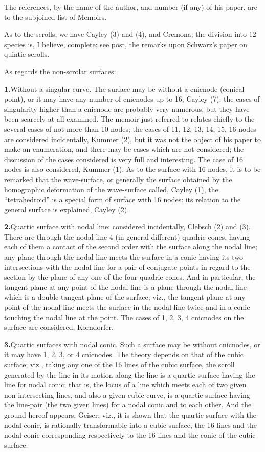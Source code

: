 \documentclass[11pt,a4paper]{article}
\begin{document}
The references, by the name of the author, and number (if any) of his paper, are to the subjoined list of Memoirs.

As to the scrolls, we have Cayley (3) and (4), and Cremona; the division into 12 species is, I believe, complete: see post, the remarks upon Schwarz's paper on quintic scrolls.

As regards the non-scrolar surfaces:

\textbf{1.}\quad Without a singular curve. The surface may be without a cnicnode (conical point), or it may have any number of cnicnodes up to 16, Cayley (7): the cases of singularity higher than a cnicnode are probably very numerous, but they have been scarcely at all examined. The memoir just referred to relates chiefly to the several cases of not more than 10 nodes; the cases of 11, 12, 13, 14, 15, 16 nodes are considered incidentally, Kummer (2), but it was not the object of his paper to make an enumeration, and there may be cases which are not considered; the discussion of the cases considered is very full and interesting. The case of 16 nodes is also considered, Kummer (1). As to the surface with 16 nodes, it is to be remarked that the wave-surface, or generally the surface obtained by the homographic deformation of the wave-surface called, Cayley (1), the ``tetrahedroid'' is a special form of surface with 16 nodes: its relation to the general surface is explained, Cayley (2).

\textbf{2.}\quad Quartic surface with nodal line: considered incidentally, Clebsch (2) and (3). There are through the nodal line 4 (in general different) quadric cones, having each of them a contact of the second order with the surface along the nodal line; any plane through the nodal line meets the surface in a conic having its two intersections with the nodal line for a pair of conjugate points in regard to the section by the plane of any one of the four quadric cones. And in particular, the tangent plane at any point of the nodal line is a plane through the nodal line which is a double tangent plane of the surface; viz., the tangent plane at any point of the nodal line meets the surface in the nodal line twice and in a conic touching the nodal line at the point. The cases of 1, 2, 3, 4 cnicnodes on the surface are considered, Korndorfer.

\textbf{3.}\quad Quartic surfaces with nodal conic. Such a surface may be without cnicnodes, or it may have 1, 2, 3, or 4 cnicnodes. The theory depends on that of the cubic surface; viz., taking any one of the 16 lines of the cubic surface, the scroll generated by the line in its motion along the line is a quartic surface having the line for nodal conic; that is, the locus of a line which meets each of two given non-intersecting lines, and also a given cubic curve, is a quartic surface having the line-pair (the two given lines) for a nodal conic and to each other. And the ground hereof appears, Geiser; viz., it is shown that the quartic surface with the nodal conic, is rationally transformable into a cubic surface, the 16 lines and the nodal conic corresponding respectively to the 16 lines and the conic of the cubic surface.
\end{document}
